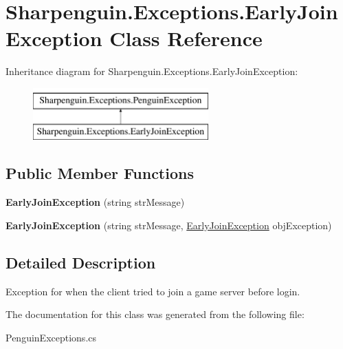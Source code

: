 \hypertarget{classSharpenguin_1_1Exceptions_1_1EarlyJoinException}{\section{Sharpenguin.\-Exceptions.\-Early\-Join\-Exception Class Reference}
\label{classSharpenguin_1_1Exceptions_1_1EarlyJoinException}
}
Inheritance diagram for Sharpenguin.\-Exceptions.\-Early\-Join\-Exception\-:\begin{figure}[H]
\begin{center}
\leavevmode
\includegraphics[height=2.000000cm]{classSharpenguin_1_1Exceptions_1_1EarlyJoinException}
\end{center}
\end{figure}
\subsection*{Public Member Functions}
\begin{DoxyCompactItemize}
\item 
\hypertarget{classSharpenguin_1_1Exceptions_1_1EarlyJoinException_a1c4b16d9df4dc74fb1a3ab63888f4384}{{\bfseries Early\-Join\-Exception} (string str\-Message)}\label{classSharpenguin_1_1Exceptions_1_1EarlyJoinException_a1c4b16d9df4dc74fb1a3ab63888f4384}

\item 
\hypertarget{classSharpenguin_1_1Exceptions_1_1EarlyJoinException_a8178db705f2d80a7512fd4a1bd14c1d8}{{\bfseries Early\-Join\-Exception} (string str\-Message, \hyperlink{classSharpenguin_1_1Exceptions_1_1EarlyJoinException}{Early\-Join\-Exception} obj\-Exception)}\label{classSharpenguin_1_1Exceptions_1_1EarlyJoinException_a8178db705f2d80a7512fd4a1bd14c1d8}

\end{DoxyCompactItemize}


\subsection{Detailed Description}
Exception for when the client tried to join a game server before login. 

The documentation for this class was generated from the following file\-:\begin{DoxyCompactItemize}
\item 
Penguin\-Exceptions.\-cs\end{DoxyCompactItemize}
